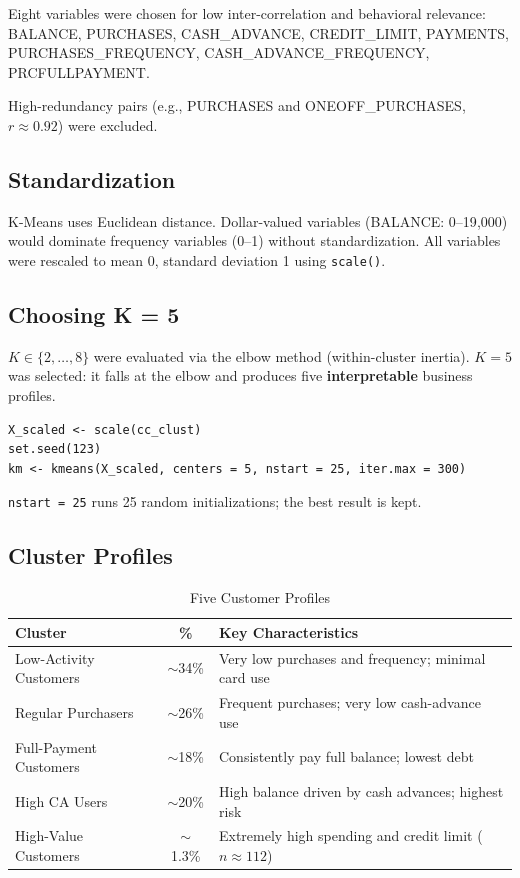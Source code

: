 \documentclass[12pt, letterpaper]{article}
\begin{document}
Eight variables were chosen for low inter-correlation and behavioral relevance:
BALANCE, PURCHASES, CASH\_ADVANCE, CREDIT\_LIMIT, PAYMENTS,
PURCHASES\_FREQUENCY, CASH\_ADVANCE\_FREQUENCY, PRCFULLPAYMENT.

High-redundancy pairs (e.g., PURCHASES and ONEOFF\_PURCHASES, $r\approx0.92$)
were excluded.

\subsection{Standardization}

K-Means uses Euclidean distance. Dollar-valued variables (BALANCE: 0--19{,}000)
would dominate frequency variables (0--1) without standardization.
All variables were rescaled to mean 0, standard deviation 1 using \texttt{scale()}.

\subsection{Choosing K = 5}

$K \in \{2,\ldots,8\}$ were evaluated via the elbow method (within-cluster inertia).
$K=5$ was selected: it falls at the elbow and produces five \textbf{interpretable}
business profiles.

\begin{lstlisting}[caption={K-Means Setup}]
X_scaled <- scale(cc_clust)
set.seed(123)
km <- kmeans(X_scaled, centers = 5, nstart = 25, iter.max = 300)
\end{lstlisting}

\texttt{nstart = 25} runs 25 random initializations; the best result is kept.

\subsection{Cluster Profiles}

\begin{table}[H]
  \centering
  \caption{Five Customer Profiles}
  \renewcommand{\arraystretch}{1.35}
  \begin{tabular}{p{4.5cm} c p{6.5cm}}
    \toprule
    \textbf{Cluster} & \textbf{\%} & \textbf{Key Characteristics} \\
    \midrule
    Low-Activity Customers  & $\sim$34\% & Very low purchases and frequency; minimal card use \\
    Regular Purchasers      & $\sim$26\% & Frequent purchases; very low cash-advance use \\
    Full-Payment Customers  & $\sim$18\% & Consistently pay full balance; lowest debt \\
    High CA Users           & $\sim$20\% & High balance driven by cash advances; highest risk \\
    High-Value Customers    & $\sim$1.3\% & Extremely high spending and credit limit ($n\approx112$) \\
    \bottomrule
  \end{tabular}
\end{table}
\end{document}
